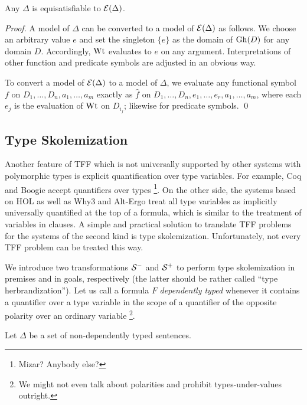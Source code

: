 \begin{theorem} \label{thm:eli}
Any $\Delta$ is equisatisfiable to $\mathcal{E}(\Delta)$.
\end{theorem}
\begin{proof}
A model of $\Delta$ can be converted to a model of $\mathcal{E}(\Delta)$
as follows. We choose an arbitrary value $e$ and set the singleton
$\{ e \}$ as the domain of $\mathrm{Gh}(D)$ for any domain $D$.
Accordingly, $\mathrm{Wt}$ evaluates to $e$ on any argument.
Interpretations of other function and predicate symbols are
adjusted in an obvious way.

To convert a model of $\mathcal{E}(\Delta)$
to a model of $\Delta$, we evaluate any functional symbol
$f$ on $D_1,\dots,D_n,a_1,\dots,a_m$ exactly as
$\hat{f}$ on $D_1,\dots,D_n,e_1,\dots,e_r,a_1,\dots,a_m$,
where each $e_j$ is the evaluation of $\mathrm{Wt}$ on $D_{i_j}$;
likewise for predicate symbols.
\qed
\end{proof}

\subsection{Type Skolemization} \label{ssec:skol}

Another feature of TFF which is not universally supported
by other systems with polymorphic types is explicit
quantification over type variables.
For example, Coq and Boogie accept quantifiers over types%
\footnote{Mizar? Anybody else?}.
On the other side, the systems based on HOL as well as Why3 and
Alt-Ergo treat all type variables as implicitly universally
quantified at the top of a formula, which is similar to
the treatment of variables in clauses.
A simple and practical solution to translate TFF problems
for the systems of the second kind is type skolemization.
Unfortunately, not every TFF problem can be treated this way.

We introduce two transformations $\mathcal{S}^-$ and $\mathcal{S}^+$ to
perform type skolemization in premises and in goals, respectively
(the latter should be rather called ``type herbrandization'').
Let us call a formula $F$ {\em dependently typed} whenever
it contains a quantifier over a type variable in the scope
of a quantifier of the opposite polarity over an ordinary
variable%
\footnote{We might not even talk about polarities and prohibit
types-under-values outright.}.

Let $\Delta$ be a set of non-dependently typed sentences.

